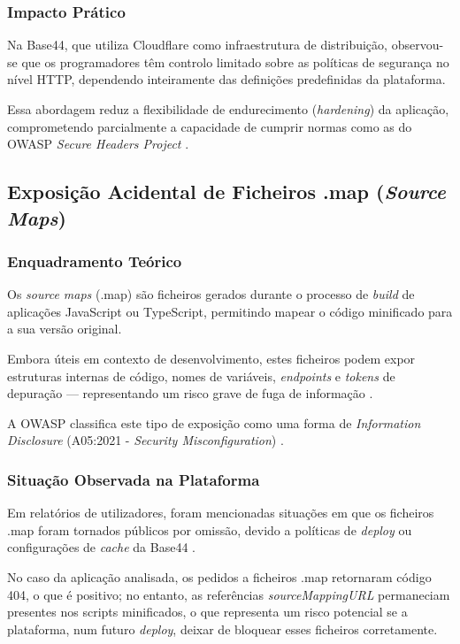 \subsubsection{Impacto Prático}

Na Base44, que utiliza Cloudflare como infraestrutura de distribuição, observou-se que os programadores têm controlo limitado sobre as políticas de segurança no nível HTTP, dependendo inteiramente das definições predefinidas da plataforma.

Essa abordagem reduz a flexibilidade de endurecimento (\textit{hardening}) da aplicação, comprometendo parcialmente a capacidade de cumprir normas como as do OWASP \textit{Secure Headers Project} \cite{ref19}.

\subsection{Exposição Acidental de Ficheiros .map (\textit{Source Maps})}

\subsubsection{Enquadramento Teórico}

Os \textit{source maps} (.map) são ficheiros gerados durante o processo de \textit{build} de aplicações JavaScript ou TypeScript, permitindo mapear o código minificado para a sua versão original.

Embora úteis em contexto de desenvolvimento, estes ficheiros podem expor estruturas internas de código, nomes de variáveis, \textit{endpoints} e \textit{tokens} de depuração — representando um risco grave de fuga de informação \cite{ref20}.

A OWASP classifica este tipo de exposição como uma forma de \textit{Information Disclosure} (A05:2021 - \textit{Security Misconfiguration}) \cite{ref21}.

\subsubsection{Situação Observada na Plataforma}

Em relatórios de utilizadores, foram mencionadas situações em que os ficheiros .map foram tornados públicos por omissão, devido a políticas de \textit{deploy} ou configurações de \textit{cache} da Base44 \cite{ref22}.

No caso da aplicação analisada, os pedidos a ficheiros .map retornaram código 404, o que é positivo; no entanto, as referências \textit{sourceMappingURL} permaneciam presentes nos scripts minificados, o que representa um risco potencial se a plataforma, num futuro \textit{deploy}, deixar de bloquear esses ficheiros corretamente.

